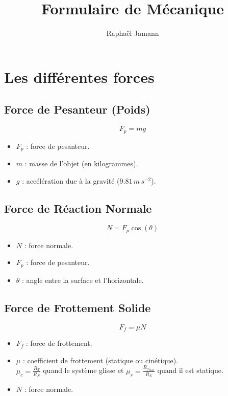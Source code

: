 \documentclass[a4paper,12pt]{article}
\title{Formulaire de Mécanique}
\author{Raphaël Jamann}
\date{}
\begin{document}
    \maketitle

    \section{Les différentes forces}

    \begin{multicols}{2}
        
        \subsection{Force de Pesanteur (Poids)}
            $$ F_p = m g $$
            \begin{itemize}[label=$\bullet$]
                \item $F_p$ : force de pesanteur.
                \item $m$ : masse de l'objet (en kilogrammes).
                \item $g$ : accélération due à la gravité ($9.81 \, m \, s^{-2}$).
            \end{itemize}
            
        \subsection{Force de Réaction Normale}
                $$ N = F_p \cos(\theta) $$
            \begin{itemize}[label=$\bullet$]
                \item $N$ : force normale.
                \item $F_p$ : force de pesanteur.
                \item $\theta$ : angle entre la surface et l'horizontale.
            \end{itemize}
            
        \subsection{Force de Frottement Solide}
                $$ F_f = \mu N $$
            \begin{itemize}[label=$\bullet$]
                \item $F_f$ : force de frottement.
                \item $\mu$ : coefficient de frottement (statique ou cinétique).\\
                $\mu_c=\frac{R_T}{R_N}$ quand le système glisse et $\mu_s=\frac{R_{T_{max}}}{R_N}$ quand il est statique.
                \item $N$ : force normale.
            \end{itemize}
            

\end{multicols}
\end{document}
